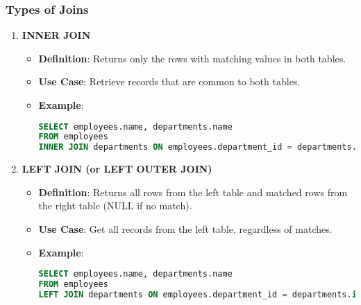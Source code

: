 \documentclass[aspectratio=169]{beamer}
\begin{document}
\begin{frame}[fragile]
    \frametitle{Types of Joins}

    \begin{enumerate}
        \item \textbf{INNER JOIN}
        \begin{itemize}
            \item \textbf{Definition}: Returns only the rows with matching values in both tables.
            \item \textbf{Use Case}: Retrieve records that are common to both tables.
            \item \textbf{Example}: 
            \begin{lstlisting}[language=SQL]
SELECT employees.name, departments.name 
FROM employees 
INNER JOIN departments ON employees.department_id = departments.id;
            \end{lstlisting}
        \end{itemize}

        \item \textbf{LEFT JOIN (or LEFT OUTER JOIN)}
        \begin{itemize}
            \item \textbf{Definition}: Returns all rows from the left table and matched rows from the right table (NULL if no match).
            \item \textbf{Use Case}: Get all records from the left table, regardless of matches.
            \item \textbf{Example}: 
            \begin{lstlisting}[language=SQL]
SELECT employees.name, departments.name 
FROM employees 
LEFT JOIN departments ON employees.department_id = departments.id;
            \end{lstlisting}
        \end{itemize}
    \end{enumerate}
\end{frame}
\end{document}
